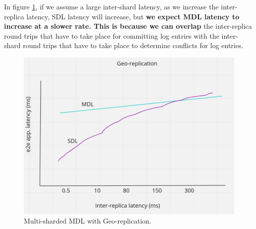 In figure \ref{fig:geo-rep}, if we assume a large inter-shard latency, as we increase the inter-replica latency, SDL latency will increase, but \textbf{we expect MDL latency to increase at a slower rate. This is because we can overlap} the inter-replica round trips that have to take place for committing log entries with the inter-shard round trips that have to take place to determine conflicts for log entries.
\begin{figure}[!htb]
\includegraphics[scale=.25]{geo-rep.png}
\caption{Multi-sharded MDL with Geo-replication.}
\label{fig:geo-rep}
\end{figure}
